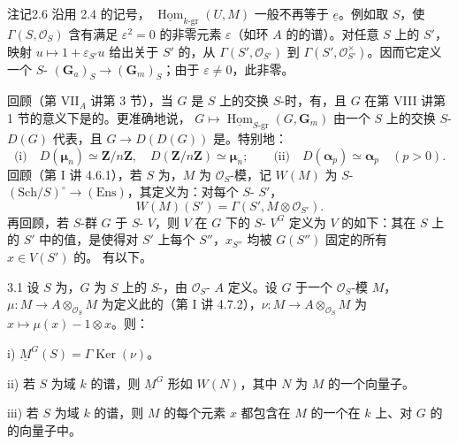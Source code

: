 \begin{SGAresult}{注记}{2.6}
沿用 2.4 的记号， $\underline{\operatorname{Hom}}_{k\text{-gr}}(U,M)$ 一般不再等于 $\underline e$。例如取 $S$，使 $\Gamma(S,\mathscr O_S)$ 含有满足 $\varepsilon^2=0$ 的非零元素 $\varepsilon$（如环 $A$ 的的谱）。对任意 $S$ 上的 $S'$，映射 $u\mapsto1+\varepsilon_{S'}u$ 给出关于 $S'$ 的，从 $\Gamma(S',\mathscr O_{S'})$ 到 $\Gamma(S',\mathscr O_{S'}^\times)$。因而它定义一个 $S$- $(\mathbf G_a)_S\to(\mathbf G_m)_S$；由于 $\varepsilon\ne0$，此非零。
\end{SGAresult}
回顾（第 VII$_A$ 讲第 3 节），当 $G$ 是 $S$ 上的交换 $S$-时，有，且 $G$ 在第 VIII 讲第 1 节的意义下是的。更准确地说， $G\mapsto\underline{\operatorname{Hom}}_{S\text{-gr}}(G,\mathbf G_m)$
由一个 $S$ 上的交换 $S$- $D(G)$ 代表，且 $G\to D(D(G))$ 是。特别地：
\[
\text{(i)}\quad D(\boldsymbol\mu_n)\simeq\mathbf Z/n\mathbf Z,\quad D(\mathbf Z/n\mathbf Z)\simeq\boldsymbol\mu_n;
\qquad\text{(ii)}\quad D(\boldsymbol\alpha_p)\simeq\boldsymbol\alpha_p\quad(p>0).
\]
回顾（第 I 讲 4.6.1），若 $S$ 为，$M$ 为 $\mathscr O_S$-模，记 $W(M)$ 为 $S$- $(\mathrm{Sch}/S)^\circ\to(\mathrm{Ens})$，其定义为：对每个 $S$- $S'$，
\[W(M)(S')=\Gamma(S',M\otimes\mathscr O_{S'}).\]
再回顾，若 $S$-群 $G$ 于 $S$- $V$，则 $V$ 在 $G$ 下的 $S$- $V^G$ 定义为 $V$ 的如下：其在 $S$ 上的 $S'$ 中的值，是使得对 $S'$ 上每个 $S''$，$x_{S''}$ 均被 $G(S'')$ 固定的所有 $x\in V(S')$ 的。
有以下。
\begin{SGAresult}{}{3.1}
设 $S$ 为，$G$ 为 $S$ 上的 $S$-，由 $\mathscr O_S$- $A$ 定义。设 $G$ 于一个 $\mathscr O_S$-模 $M$，$\mu:M\to A\otimes_{\mathscr O_S}M$ 为定义此的（第 I 讲 4.7.2），$\nu:M\to A\otimes_{\mathscr O_S}M$ 为 $x\mapsto\mu(x)-1\otimes x$。则：

i) $\underline M^G(S)=\Gamma\operatorname{Ker}(\nu)$。

ii) 若 $S$ 为域 $k$ 的谱，则 $\underline M^G$ 形如 $W(N)$，其中 $N$ 为 $M$ 的一个向量子。

iii) 若 $S$ 为域 $k$ 的谱，则 $M$ 的每个元素 $x$ 都包含在 $M$ 的一个在 $k$ 上、对 $G$ 的的向量子中。
\end{SGAresult}
